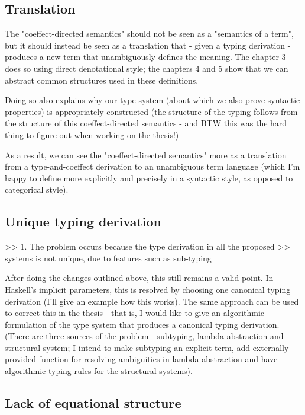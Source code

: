 \documentclass[
		twoside,openright,titlepage,numbers=noenddot,headinclude,%
                footinclude=true,cleardoublepage=empty,
                BCOR=10mm,paper=a4,fontsize=10pt, %
                ngerman,american, %
                ]{scrreprt}
\begin{document}
\subsection{Translation}

The "coeffect-directed semantics" should not be seen as a "semantics of a term", but it should
instead be seen as a translation that - given a typing derivation - produces a new term that
unambiguously defines the meaning. The chapter 3 does so using direct denotational style; the
chapters 4 and 5 show that we can abstract common structures used in these definitions.

Doing so also explains why our type system (about which we also prove syntactic properties) is
appropriately constructed (the structure of the typing follows from the structure of this
coeffect-directed semantics - and BTW this was the hard thing to figure out when working on the thesis!)

As a result, we can see the "coeffect-directed semantics" more as a translation from a type-and-coeffect
derivation to an unambiguous term language (which I'm happy to define more explicitly and precisely
in a syntactic style, as opposed to categorical style).

\subsection{Unique typing derivation}

>> 1. The problem occurs because the type derivation in all the proposed
>> systems is not unique, due to features such as sub-typing

After doing the changes outlined above, this still remains a valid point. In Haskell's implicit
parameters, this is resolved by choosing one canonical typing derivation (I'll give an example how
this works). The same approach can be used to correct this in the thesis - that is, I would like
to give an algorithmic formulation of the type system that produces a canonical typing derivation.
(There are three sources of the problem - subtyping, lambda abstraction and structural system; I
intend to make subtyping an explicit term, add externally provided function for resolving ambiguities
in lambda abstraction and have algorithmic typing rules for the structural systems).

\subsection{Lack of equational structure}
\end{document}
